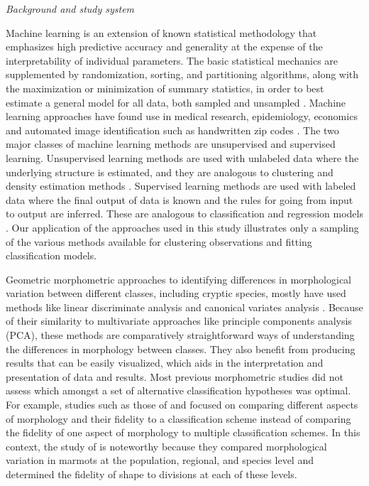 \documentclass[12pt,letterpaper]{article}
\renewcommand{\subsection}[1]{%
\bigskip
\begin{center}
\begin{large}
\normalfont\itshape #1
\end{large}
\end{center}}
\begin{document}
\subsection{Background and study system}
Machine learning is an extension of known statistical methodology \citep{Hastie2009} that emphasizes high predictive accuracy and generality at the expense of the interpretability of individual parameters. The basic statistical mechanics are supplemented by randomization, sorting, and partitioning algorithms, along with the maximization or minimization of summary statistics, in order to best estimate a general model for all data, both sampled and unsampled \citep{Hastie2009}. Machine learning approaches have found use in medical research, epidemiology, economics and automated image identification such as handwritten zip codes \citep{Hastie2009}. The two major classes of machine learning methods are unsupervised and supervised learning. Unsupervised learning methods are used with unlabeled data where the underlying structure is estimated, and they are analogous to clustering and density estimation methods \citep{Kaufman1990}. Supervised learning methods are used with labeled data where the final output of data is known and the rules for going from input to output are inferred. These are analogous to classification and regression models \citep{Breiman1984}. Our application of the approaches used in this study illustrates only a sampling of the various methods available for clustering observations and fitting classification models. 

Geometric morphometric approaches to identifying differences in morphological variation between different classes, including cryptic species, mostly have used methods like linear discriminate analysis and canonical variates analysis \citep{Polly2003,Zelditch2004,Gaubert2005b,Gunduz2007,Polly2007a,Francoy2009,Sztencel-Jabonka2009,MitrovskiBogdanovic2013}. Because of their similarity to multivariate approaches like principle components analysis (PCA), these methods are comparatively straightforward ways of understanding the differences in morphology between classes. They also benefit from producing results that can be easily visualized, which aids in the interpretation and presentation of data and results. Most previous morphometric studies did not assess which amongst a set of alternative classification hypotheses was optimal. For example, studies such as those of \citet{Caumul2005a} and \citet{Polly2007a} focused on comparing different aspects of morphology and their fidelity to a classification scheme instead of comparing the fidelity of one aspect of morphology to multiple classification schemes. In this context, the study of \citet{Cardini2009a} is noteworthy because they compared morphological variation in marmots at the population, regional, and species level and determined the fidelity of shape to divisions at each of these levels.
\end{document}
